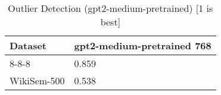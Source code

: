 \begin{table}[]
\centering
\begin{tabular}{l|l}
\hline
Dataset & gpt2-medium-pretrained 768 \\
\hline
8-8-8 & 0.859 \\ 
WikiSem-500 & 0.538
\end{tabular}
\caption{Outlier Detection (gpt2-medium-pretrained) [1 is best]}
\label{tab:outlier-gpt2-medium-pretrained}
\end{table}
